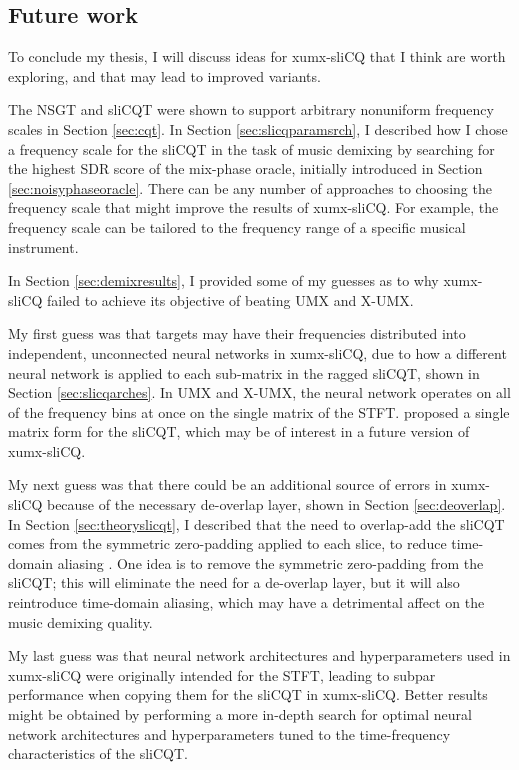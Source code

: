 \documentclass[report.tex]{subfiles}
\begin{document}
\subsection{Future work}

To conclude my thesis, I will discuss ideas for xumx-sliCQ that I think are worth exploring, and that may lead to improved variants.

The NSGT and sliCQT were shown to support arbitrary nonuniform frequency scales in Section \ref{sec:cqt}. In Section \ref{sec:slicqparamsrch}, I described how I chose a frequency scale for the sliCQT in the task of music demixing by searching for the highest SDR score of the mix-phase oracle, initially introduced in Section \ref{sec:noisyphaseoracle}. There can be any number of approaches to choosing the frequency scale that might improve the results of xumx-sliCQ. For example, the frequency scale can be tailored to the frequency range of a specific musical instrument.

In Section \ref{sec:demixresults}, I provided some of my guesses as to why xumx-sliCQ failed to achieve its objective of beating UMX and X-UMX.

My first guess was that targets may have their frequencies distributed into independent, unconnected neural networks in xumx-sliCQ, due to how a different neural network is applied to each sub-matrix in the ragged sliCQT, shown in Section \ref{sec:slicqarches}. In UMX and X-UMX, the neural network operates on all of the frequency bins at once on the single matrix of the STFT. \textcite{variableq1} proposed a single matrix form for the sliCQT, which may be of interest in a future version of xumx-sliCQ.

My next guess was that there could be an additional source of errors in xumx-sliCQ because of the necessary de-overlap layer, shown in Section \ref{sec:deoverlap}. In Section \ref{sec:theoryslicqt}, I described that the need to overlap-add the sliCQT comes from the symmetric zero-padding applied to each slice, to reduce time-domain aliasing \parencite{slicq}. One idea is to remove the symmetric zero-padding from the sliCQT; this will eliminate the need for a de-overlap layer, but it will also reintroduce time-domain aliasing, which may have a detrimental affect on the music demixing quality.

My last guess was that neural network architectures and hyperparameters used in xumx-sliCQ were originally intended for the STFT, leading to subpar performance when copying them for the sliCQT in xumx-sliCQ. Better results might be obtained by performing a more in-depth search for optimal neural network architectures and hyperparameters tuned to the time-frequency characteristics of the sliCQT.
\end{document}
